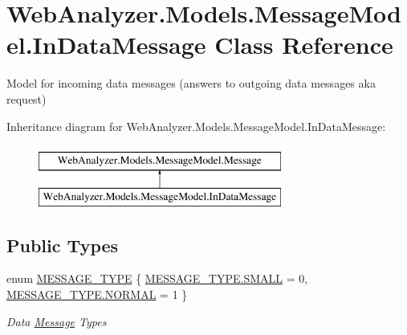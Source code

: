\hypertarget{class_web_analyzer_1_1_models_1_1_message_model_1_1_in_data_message}{}\section{Web\+Analyzer.\+Models.\+Message\+Model.\+In\+Data\+Message Class Reference}
\label{class_web_analyzer_1_1_models_1_1_message_model_1_1_in_data_message}


Model for incoming data messages (answers to outgoing data messages aka request)  


Inheritance diagram for Web\+Analyzer.\+Models.\+Message\+Model.\+In\+Data\+Message\+:\begin{figure}[H]
\begin{center}
\leavevmode
\includegraphics[height=2.000000cm]{class_web_analyzer_1_1_models_1_1_message_model_1_1_in_data_message}
\end{center}
\end{figure}
\subsection*{Public Types}
\begin{DoxyCompactItemize}
\item 
enum \hyperlink{class_web_analyzer_1_1_models_1_1_message_model_1_1_in_data_message_a5c01620a5429c5eec75477e614c96f94}{M\+E\+S\+S\+A\+G\+E\+\_\+\+T\+Y\+P\+E} \{ \hyperlink{class_web_analyzer_1_1_models_1_1_message_model_1_1_in_data_message_a5c01620a5429c5eec75477e614c96f94a9b9c17e13f0e3dc9860a26e08b59b2a7}{M\+E\+S\+S\+A\+G\+E\+\_\+\+T\+Y\+P\+E.\+S\+M\+A\+L\+L} = 0, 
\hyperlink{class_web_analyzer_1_1_models_1_1_message_model_1_1_in_data_message_a5c01620a5429c5eec75477e614c96f94a1e23852820b9154316c7c06e2b7ba051}{M\+E\+S\+S\+A\+G\+E\+\_\+\+T\+Y\+P\+E.\+N\+O\+R\+M\+A\+L} = 1
 \}\begin{DoxyCompactList}\small\item\em Data \hyperlink{class_web_analyzer_1_1_models_1_1_message_model_1_1_message}{Message} Types \end{DoxyCompactList}
\end{DoxyCompactItemize}
